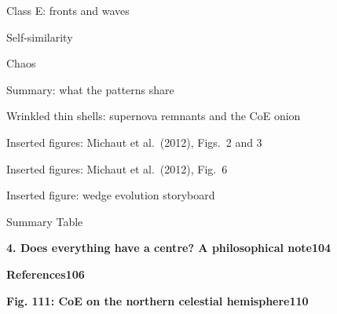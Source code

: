 \documentclass[11pt,a4paper]{article}
\begin{document}
{\noindent\hspace*{1.2em}Class E: fronts and waves\par
\noindent\hspace*{1.2em}Self-similarity\par
\noindent\hspace*{1.2em}Chaos\par
\noindent\hspace*{1.2em}Summary: what the patterns share\par
\noindent\hspace*{1.2em}Wrinkled thin shells: supernova remnants and the CoE onion\par
\noindent\hspace*{1.2em}Inserted figures: Michaut et al.\ (2012), Figs.\ 2 and 3\par
\noindent\hspace*{1.2em}Inserted figures: Michaut et al.\ (2012), Fig.\ 6\par
\noindent\hspace*{1.2em}Inserted figure: wedge evolution storyboard\par
\noindent\hspace*{1.2em}Summary Table\par
\noindent\textbf{4. Does everything have a centre? A philosophical note}\dotfill\textbf{104}\par\smallskip
\noindent\textbf{References}\dotfill\textbf{106}\par\smallskip
\noindent\textbf{Fig. 111: CoE on the northern celestial hemisphere}\dotfill\textbf{110}\par\smallskip
}
\clearpage
\end{document}
